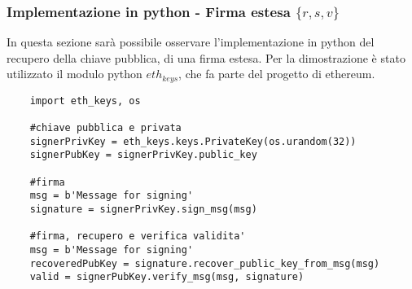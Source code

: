 \subsubsection{Implementazione in python - Firma estesa $\{r, s, v\}$}

In questa sezione sarà possibile osservare l'implementazione in python del recupero della chiave pubblica, di una firma estesa. Per la dimostrazione è stato utilizzato il modulo python $eth_{keys}$, che fa parte del progetto di ethereum. 

\begin{lstlisting}
	import eth_keys, os
	
	#chiave pubblica e privata
	signerPrivKey = eth_keys.keys.PrivateKey(os.urandom(32))
	signerPubKey = signerPrivKey.public_key
	
	#firma
	msg = b'Message for signing'
	signature = signerPrivKey.sign_msg(msg)
	
	#firma, recupero e verifica validita'
	msg = b'Message for signing'
	recoveredPubKey = signature.recover_public_key_from_msg(msg)
	valid = signerPubKey.verify_msg(msg, signature)
\end{lstlisting}
